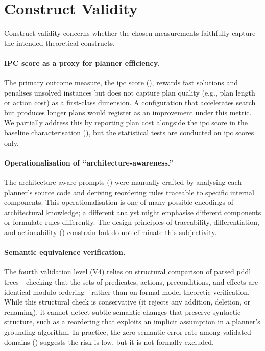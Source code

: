 \section{Construct Validity}
\label{sec:threats:construct}

Construct validity concerns whether the chosen measurements faithfully capture the intended theoretical constructs.

\paragraph{IPC score as a proxy for planner efficiency.}
The primary outcome measure, the \gls{ipc} score (), rewards fast solutions and penalises unsolved instances but does not capture plan quality (e.g., plan length or action cost) as a first-class dimension.
A configuration that accelerates search but produces longer plans would register as an improvement under this metric.
We partially address this by reporting plan cost alongside the \gls{ipc} score in the baseline characterisation (), but the statistical tests are conducted on \gls{ipc} scores only.

\paragraph{Operationalisation of ``architecture-awareness.''}
The architecture-aware prompts () were manually crafted by analysing each planner's source code and deriving reordering rules traceable to specific internal components.
This operationalisation is one of many possible encodings of architectural knowledge; a different analyst might emphasise different components or formulate rules differently.
The design principles of traceability, differentiation, and actionability () constrain but do not eliminate this subjectivity.

\paragraph{Semantic equivalence verification.}
The fourth validation level (V4) relies on structural comparison of parsed \gls{pddl} trees---checking that the sets of predicates, actions, preconditions, and effects are identical modulo ordering---rather than on formal model-theoretic verification.
While this structural check is conservative (it rejects any addition, deletion, or renaming), it cannot detect subtle semantic changes that preserve syntactic structure, such as a reordering that exploits an implicit assumption in a planner's grounding algorithm.
In practice, the zero semantic-error rate among validated domains () suggests the risk is low, but it is not formally excluded.


